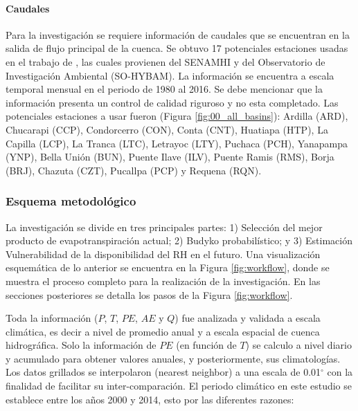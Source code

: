 \documentclass[12pt]{article}
\begin{document}
\paragraph{Caudales}\mbox{}

Para la investigación se requiere información de caudales que se encuentran en la salida de flujo principal de la cuenca. Se obtuvo 17 potenciales estaciones usadas en el trabajo de \citet{Aybar2019}, las cuales provienen del SENAMHI y del Observatorio de Investigación Ambiental (SO-HYBAM). La información se encuentra a escala temporal mensual en el periodo de 1980 al 2016. Se debe mencionar que la información presenta un control de calidad riguroso y no esta completado. Las potenciales estaciones a usar fueron (Figura \ref{fig:00_all_basins}): Ardilla (ARD), Chucarapi (CCP), Condorcerro (CON), Conta (CNT), Huatiapa (HTP), La Capilla (LCP), La Tranca (LTC), Letrayoc (LTY), Puchaca (PCH), Yanapampa (YNP), Bella Unión (BUN), Puente Ilave (ILV), Puente Ramis (RMS), Borja (BRJ), Chazuta (CZT), Pucallpa (PCP) y Requena (RQN).





\subsubsection{Esquema metodológico}

La investigación se divide en tres principales partes: 1) Selección del mejor producto de evapotranspiración actual; 2) Budyko probabilístico; y 3) Estimación Vulnerabilidad de la disponibilidad del RH en el futuro. Una visualización esquemática de lo anterior se encuentra en la Figura \ref{fig:workflow}, donde se muestra el proceso completo para la realización de la investigación. En las secciones posteriores se detalla los pasos de la Figura \ref{fig:workflow}.



Toda la información ($P$, $T$, $PE$, $AE$ y $Q$) fue analizada y validada a escala climática, es decir a nivel de promedio anual y a escala espacial de cuenca hidrográfica. Solo la información de $PE$ (en función de $T$) se calculo a nivel diario y acumulado para obtener valores anuales, y posteriormente, sus climatologías. Los datos grillados se interpolaron (nearest neighbor) a una escala de 0.01$^{\circ}$ con la finalidad de facilitar su inter-comparación. El periodo climático en este estudio se establece entre los años 2000 y 2014, esto por las diferentes razones:
\end{document}
